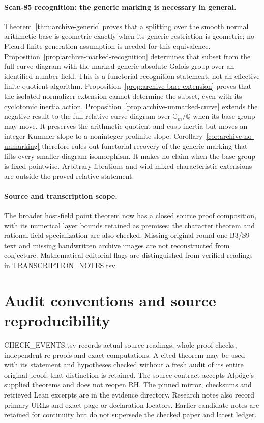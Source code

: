 \documentclass[11pt,a4paper]{article}
\theoremstyle{definition}
\begin{document}
\paragraph{Scan-85 recognition: the generic marking is necessary in general.}
Theorem~\ref{thm:archive-generic} proves that a splitting over the
smooth normal arithmetic base is geometric exactly when its generic
restriction is geometric; no Picard finite-generation assumption is
needed for this equivalence.
Proposition~\ref{prop:archive-marked-recognition} determines that
subset from the full curve diagram with the marked generic absolute
Galois group over an identified number field. This is a functorial
recognition statement, not an effective finite-quotient algorithm.
Proposition~\ref{prop:archive-bare-extension} proves that the isolated
normalizer extension cannot determine the subset, even with its
cyclotomic inertia action. Proposition~\ref{prop:archive-unmarked-curve}
extends the negative result to the full relative curve diagram over
$\mathbb G_m/\mathbb Q$ when its base group may move. It preserves
the arithmetic quotient and cusp inertia but moves an integer Kummer
slope to a noninteger profinite slope.
Corollary~\ref{cor:archive-no-unmarking} therefore rules out functorial
recovery of the generic marking that lifts every smaller-diagram
isomorphism. It makes no claim when the base group is fixed pointwise.
Arbitrary
fibrations and wild mixed-characteristic extensions are outside the
proved relative statement.

\paragraph{Source and transcription scope.}
The broader host-field point theorem now has a closed source proof
composition, with its numerical layer bounds retained as premises;
the character theorem and rational-field specialization are also checked. Missing original
round-one B3/S9 text and missing handwritten archive images are not
reconstructed from conjecture. Mathematical editorial flags are
distinguished from verified readings in TRANSCRIPTION\_NOTES.tsv.

\section{Audit conventions and source reproducibility}
CHECK\_EVENTS.tsv records actual source readings, whole-proof checks,
independent re-proofs and exact computations. A cited theorem may be
used with its statement and hypotheses checked without a fresh audit of
its entire original proof; that distinction is retained. The source
contract accepts Alp\"oge's supplied theorems and does not reopen RH.
The pinned mirror, checksums and retrieved Lean excerpts are in the
evidence directory. Research notes also record primary URLs and exact
page or declaration locators. Earlier candidate notes are retained for
continuity but do not supersede the checked paper and latest ledger.
\end{document}
